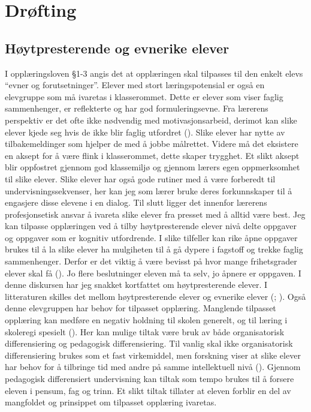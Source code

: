 \documentclass[main.tex]{subfiles}
\begin{document}
\section*{Drøfting}

\subsection*{Høytpresterende og evnerike elever}

I opplæringsloven \S 1-3 angis det at opplæringen skal tilpasses til den enkelt elevs ``evner og forutsetninger''.  Elever med stort læringspotensial er også en elevgruppe som må ivaretas i klasserommet. Dette er elever som viser faglig sammenhenger, er reflekterte og har god formuleringsevne. Fra lærerens perspektiv er det ofte ikke nødvendig med motivasjonsarbeid, derimot kan slike elever kjede seg hvis de ikke blir faglig utfordret (). Slike elever har nytte av tilbakemeldinger som hjelper de med å jobbe målrettet. Videre må det eksistere en aksept for å være flink i klasserommet, dette skaper trygghet. Et slikt aksept blir oppfostret gjennom god klassemiljø og gjennom lærers egen oppmerksomhet til slike elever. Slike elever har også gode rutiner med å være forberedt til undervisningssekvenser, her kan jeg som lærer bruke deres forkunnskaper til å engasjere disse elevene i en dialog. Til slutt ligger det innenfor lærerens profesjonsetisk ansvar å ivareta slike elever fra presset med å alltid være best. 
\newline\newline
Jeg kan tilpasse opplæringen ved å tilby høytpresterende elever nivå delte oppgaver og oppgaver som er kognitiv utfordrende. I slike tilfeller kan rike åpne oppgaver brukes til å la slike elever ha mulgiheten til å gå dypere i fagstoff og trekke faglig sammenhenger.  Derfor er det viktig å være bevisst på hvor mange frihetsgrader elever skal få (). Jo flere beslutninger eleven må ta selv, jo åpnere er oppgaven.
\newline\newline 
I denne diskursen har jeg snakket kortfattet om høytpresterende elever. I litteraturen skilles det mellom høytpresterende elever og evnerike elever (; ). Også denne elevgruppen har behov for tilpasset opplæring. Manglende tilpasset opplæring kan medføre en negativ holdning til skolen generelt, og til læring i skoleregi spesielt (). Her kan mulige tiltak være bruk av både organisatorisk differensiering og pedagogisk differensiering. Til vanlig skal ikke organisatorisk differensiering brukes som et fast virkemiddel, men forskning viser at slike elever har behov for å tilbringe tid med andre på samme intellektuell nivå (). Gjennom pedagogisk differensiert undervisning kan tiltak som tempo brukes til å forsere eleven i pensum, fag og trinn. Et slikt tiltak tillater at eleven forblir en del av mangfoldet og prinsippet om tilpasset opplæring ivaretas.
\end{document}
